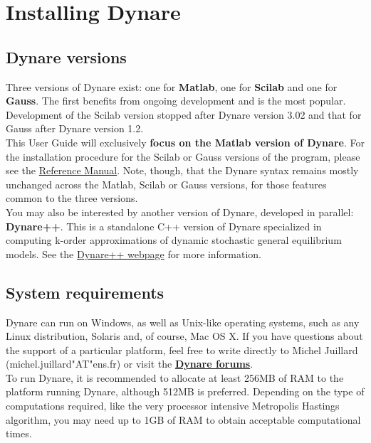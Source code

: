 \chapter{Installing Dynare} \label{ch:inst}

\section{Dynare versions}
Three versions of Dynare exist: one for \textbf{Matlab}, one for \textbf{Scilab} and one for \textbf{Gauss}. The first benefits from ongoing development and is the most popular. Development of the Scilab version stopped after Dynare version 3.02 and that for Gauss after Dynare version 1.2. \\

This User Guide will exclusively \textbf{focus on the Matlab version of Dynare}. For the installation procedure for the Scilab or Gauss versions of the program, please see the \href{http://www.cepremap.cnrs.fr/juillard/mambo/index.php?option=com_content&task=view&id=51&Itemid=84}{Reference Manual}. Note, though, that the Dynare syntax remains mostly unchanged across the Matlab, Scilab or Gauss versions, for those features common to the three versions. \\

You may also be interested by another version of Dynare, developed in parallel: \textbf{Dynare++}. This is a standalone C++ version of Dynare specialized in computing k-order approximations of dynamic stochastic general equilibrium models. See the \href{http://www.cepremap.cnrs.fr/juillard/mambo/index.php?option=com_content&task=view&id=53&Itemid=86}{Dynare++ webpage} for more information. 

\section{System requirements}
Dynare can run on Windows, as well as Unix-like operating systems, such as any Linux distribution, Solaris and, of course, Mac OS X. If you have questions about the support of a particular platform, feel free to write directly to Michel Juillard (michel.juillard"AT"ens.fr) or visit the \href{http://www.cepremap.cnrs.fr/juillard/mambo/index.php?option=com_forum&Itemid=95&page=viewforum&f=1}{\textbf{Dynare forums}}. \\

To run Dynare, it is recommended to allocate at least 256MB of RAM to the platform running Dynare, although 512MB is preferred. Depending on the type of computations required, like the very processor intensive Metropolis Hastings algorithm, you may need up to 1GB of RAM to obtain acceptable computational times. \\

